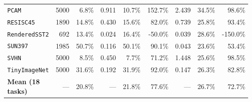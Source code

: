 \begin{table}[t]
\begin{tabular}{lr|rrrr|rrr}
\texttt{PCAM} & 5000 & 6.8\% & 0.911 & 10.7\% & 152.7\% & 2.439 & 34.5\% & 98.6\% \\
\texttt{RESISC45} & 1890 & 14.8\% & 0.430 & 15.6\% & 82.0\% & 0.739 & 25.8\% & 93.4\% \\
\texttt{RenderedSST2} & 692 & 13.4\% & 0.024 & 16.4\% & -50.0\% & 0.039 & 28.6\% & -150.0\% \\
\texttt{SUN397} & 1985 & 50.7\% & 0.116 & 50.1\% & 90.1\% & 0.043 & 23.6\% & 53.4\% \\
\texttt{SVHN} & 5000 & 8.5\% & 0.450 & 7.7\% & 71.2\% & 1.448 & 25.6\% & 98.5\% \\
\texttt{TinyImageNet} & 5000 & 31.6\% & 0.192 & 31.9\% & 92.0\% & 0.147 & 26.3\% & 82.8\% \\
\midrule
\textbf{Mean (18 tasks)} & --- & 20.8\% & --- & 21.8\% & 77.6\% & --- & 26.7\% & 72.7\% \\
\bottomrule \end{tabular} \end{table}


